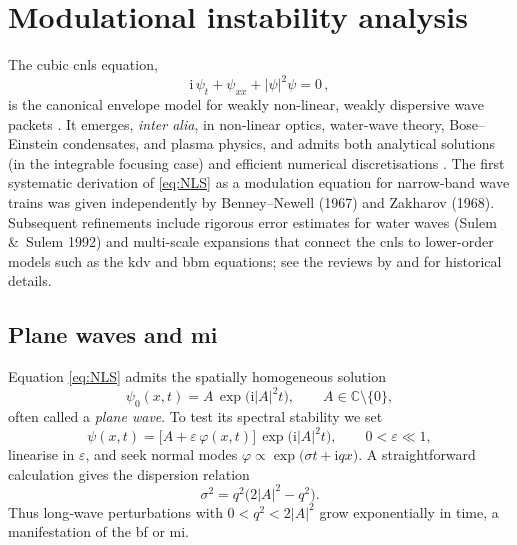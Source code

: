 \documentclass[alpha-refs, 12pt]{wiley-article}
\newcommand{\ui}{\mathrm{i}}
\newcommand{\eps}{\varepsilon}
\begin{document}
\section{Modulational instability analysis}\label{sec:MI}

The cubic \acrfull{cnls} equation,
\begin{equation}\label{eq:NLS}
  \ui\,\psi_{t} + \psi_{xx} + |\psi|^{2}\psi = 0\,,
\end{equation}
is the canonical envelope model for weakly non-linear, weakly dispersive wave packets \cite{Sulem1999, Zakharov1972}. It emerges, \textit{inter alia}, in non-linear optics, water-wave theory, Bose--Einstein condensates, and plasma physics, and admits both analytical solutions (in the integrable focusing case) and efficient numerical discretisations \cite{Agrawal2013, Taha1984}. The first systematic derivation of \eqref{eq:NLS} as a modulation equation for narrow-band wave trains was given independently by Benney--Newell (1967) and Zakharov (1968). Subsequent refinements include rigorous error estimates for water waves (Sulem \&\ Sulem 1992) and multi-scale expansions that connect the \acrshort{cnls} to lower-order models such as the \acrshort{kdv} and \acrshort{bbm} equations; see the reviews by \cite{Peregrine1983} and \cite{Hammack1993} for historical details.

\subsection{Plane waves and \acrfull{mi}}

Equation \eqref{eq:NLS} admits the spatially homogeneous solution
\begin{equation}\label{eq:plane_wave}
  \psi_{0}(x,t)=A\,\exp\bigl(\mathrm{i}|A|^{2}t\bigr), \qquad A \in \mathds{C} \setminus \{0\},
\end{equation}
often called a \emph{plane wave}. To test its spectral stability we set
\[
  \psi(x,t)=\bigl[A+\eps\,\varphi(x,t)\bigr]\,\exp\bigl(\mathrm{i}|A|^{2}t\bigr), \qquad 0<\eps\ll1,
\]
linearise in $\eps$, and seek normal modes
\(
  \varphi\propto\exp\bigl(\sigma t+\mathrm{i}qx\bigr).
\)
A straightforward calculation gives the dispersion relation
\begin{equation}\label{eq:MI_disp}
  \sigma^{2}=q^{2}\bigl(2|A|^{2}-q^{2}\bigr).
\end{equation}
Thus long‐wave perturbations with
\(
  0<q^{2}<2|A|^{2}
\)
grow exponentially in time, a manifestation of the \acrfull{bf} or \acrfull{mi}.
\end{document}
